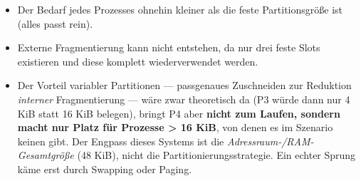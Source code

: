 \documentclass[11pt, a4paper]{article}
\begin{document}
\begin{itemize}
  \item Der Bedarf jedes Prozesses ohnehin kleiner als die feste Partitionsgröße ist (alles passt rein).
  \item Externe Fragmentierung kann nicht entstehen, da nur drei feste Slots existieren und diese komplett wiederverwendet werden.
  \item Der Vorteil variabler Partitionen — passgenaues Zuschneiden zur Reduktion \textit{interner} Fragmentierung — wäre zwar theoretisch da (P3 würde dann nur 4 KiB statt 16 KiB belegen), bringt P4 aber \textbf{nicht zum Laufen, sondern macht nur Platz für Prozesse > 16 KiB}, von denen es im Szenario keinen gibt. Der Engpass dieses Systems ist die \textit{Adressraum-/RAM-Gesamtgröße} (48 KiB), nicht die Partitionierungsstrategie. Ein echter Sprung käme erst durch Swapping oder Paging.
\end{itemize}




\end{document}
